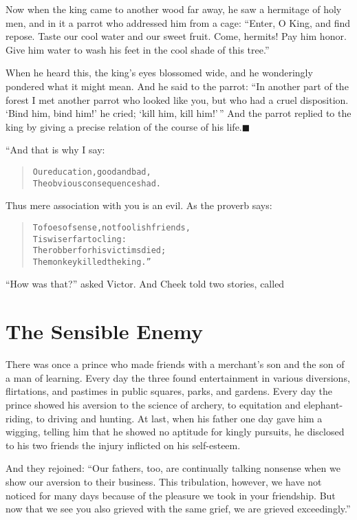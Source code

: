 \documentclass[article, twoside, 14pt]{memoir}
\newcommand{\qed}{\hfill \ensuremath{\blacksquare}}
\renewenvironment{verbatim}{%
\begin{quote}%
\vskip -10pt%
\begin{alltt}\normalfont\large}{\end{alltt}%
\end{quote}%
\vskip -10pt
} %
\begin{document}
Now when the king came to another wood far away, he saw a hermitage
of holy men, and in it a parrot who addressed him from a cage:
``Enter, O King, and find repose. Taste our cool water and our sweet fruit. Come, hermits! Pay him honor. Give him water to wash his feet in the cool shade of this tree.''

When he heard this, the king's eyes blossomed wide, and he
wonderingly pondered what it might mean. And he said to the parrot:
``In another part of the forest I met another parrot who looked like you, but who had a cruel disposition. `Bind him, bind him!' he cried; `kill him, kill him!'\,''
And the parrot replied to the king by giving a precise relation of
the course of his life.\hyperref[s32]{\qed}

“And that is why I say:

\begin{verbatim}
Our education, good and bad,
The obvious consequences had.
\end{verbatim}
Thus mere association with you is an evil. As the proverb says:

\begin{verbatim}
To foes of sense, not foolish friends,
    Tis wiser far to cling:
The robber for his victims died;
    The monkey killed the king.”
\end{verbatim}
``How was that?'' asked Victor. And Cheek told two stories, called

\chapter{The Sensible Enemy}

\label{s33}

There was once a prince who made friends with a merchant's son and
the son of a man of learning. Every day the three found
entertainment in various diversions, flirtations, and pastimes in
public squares, parks, and gardens. Every day the prince showed his
aversion to the science of archery, to equitation and
elephant-riding, to driving and hunting. At last, when his father
one day gave him a wigging, telling him that he showed no aptitude
for kingly pursuits, he disclosed to his two friends the injury
inflicted on his self-esteem.

And they rejoined:
``Our fathers, too, are continually talking nonsense when we show our aversion to their business. This tribulation, however, we have not noticed for many days because of the pleasure we took in your friendship. But now that we see you also grieved with the same grief, we are grieved exceedingly.''
\end{document}
